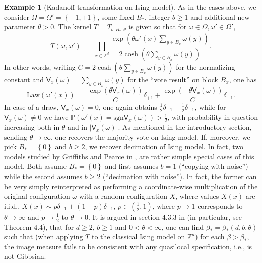 \documentclass[12pt]{article}
\renewcommand{\P}{\mathbb{P}}
\newcommand{\Z}{\mathbb{Z}}
\newcommand{\set}[1]{\left\{#1\right\}}
\newcommand{\ra}{\rightarrow}
\newcommand{\1}{\mathbbm{1}}
\newcommand{\5}{\vspace{0.5cm}}
\theoremstyle{definition}
\newtheorem{ex}[thm]{Example}
\begin{document}
\begin{ex}[Kadanoff transformation on Ising model] As in the cases above, we consider $\Omega=\Omega'=\set{-1,+1}$, some fixed $B_*$, integer $b\geq 1$ and additional new parameter $\theta>0$. The kernel $T=T_{b,B_*,\theta}$ is given so that for $\omega\in\Omega,\omega'\in\Omega'$, 
$$T(\omega,\omega') ~=~ \prod_{x\in\Z^d}\frac{\exp(\theta\omega'(x)\sum_{y\in B_x}\omega(y))}{2\cosh(\theta\sum_{y\in B_x}\omega(y))}.$$
In other words, writing $C=2\cosh(\theta\sum_{y\in B_x}\omega(y))$ for the normalizing constant and $\mathsf{V}_x(\omega)=\sum_{y\in B_x}\omega(y)$ for the ``vote result'' on block $B_x$, one has
$$\mathrm{Law}(\omega'(x)) ~=~ \frac{\exp(\theta\mathsf{V}_x(\omega))}{C}\delta_{+1}+\frac{\exp(-\theta\mathsf{V}_x(\omega))}{C}\delta_{-1}.$$
In case of a draw, $\mathsf{V}_x(\omega)=0$, one again obtains $\frac{1}{2}\delta_{+1}+\frac{1}{2}\delta_{-1}$, while for $\mathsf{V}_x(\omega)\neq 0$ we have $\P(\omega'(x)=\mathrm{sgn}\mathsf{V}_x(\omega))>\frac{1}{2}$, with probability in question increasing both in $\theta$ and in $|\mathsf{V}_x(\omega)|$. As mentioned in the introductory section, sending $\theta\ra\infty$, one recovers the majority vote on Ising model. If, moreover, we pick $B_*=\set{0}$ and $b\geq 2$, we recover decimation of Ising model. In fact, two models studied by Griffiths and Pearce in \cite{GP1}, \cite{GP2} are rather simple special cases of this model. Both assume $B_*=\set{0}$ and first assumes $b=1$ (``copying with noise'') while the second assumes $b\geq 2$ (``decimation with noise''). In fact, the former can be very simply reinterpreted as performing a coordinate-wise multiplication of the original configuration $\omega$ with a random configuration $X$, where values $X(x)$ are i.i.d., $X(x)\sim p\delta_{+1}+(1-p)\delta_{-1}$, $p\in(\frac{1}{2},1)$, where $p\ra 1$ corresponds to $\theta\ra\infty$ and $p\ra \frac{1}{2}$ to $\theta \ra 0$. It is argued in section 4.3.3 in \cite{EFS} (in particular, see Theorem 4.4), that for $d\geq 2$, $b\geq 1$ and $0<\theta<\infty$, one can find $\beta_*=\beta_*(d,b,\theta)$ such that (when applying $T$ to the classical Ising model on $\Z^d$) for each $\beta>\beta_*$, the image measure fails to be consistent with any quasilocal specification, i.e., is not Gibbsian.
\end{ex}


\pagebreak

\end{document}
